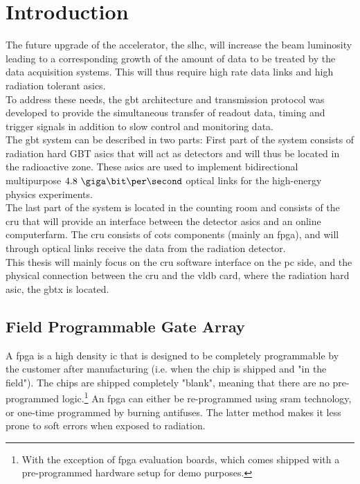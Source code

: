 \documentclass[main.tex]{subfiles}
\begin{document}
\chapter{Introduction}

The future upgrade of the  accelerator, the \gls{slhc}, will increase the beam luminosity leading to a corresponding growth of the amount of data to be treated by the data acquisition systems. This will thus require high rate data links and high radiation tolerant \glspl{asic}.\\

To address these needs, the \gls{gbt} architecture and transmission protocol was developed to provide the simultaneous transfer of readout data, timing and trigger signals in addition to slow control and monitoring data. \\

The \gls{gbt} system can be described in two parts: First part of the system consists of radiation hard GBT \glspl{asic} that will act as detectors and will thus be located in the radioactive zone. These \glspl{asic} are used to implement bidirectional multipurpose $4.8~\giga\bit\per\second$ optical links for the high-energy physics experiments. \\
The last part of the system is located in the counting room and consists of the \gls{cru} that will provide an interface between the detector \glspl{asic} and an online computerfarm. The \gls{cru} consists of \gls{cots} components (mainly an \acrshort{fpga}), and will through optical links receive the data from the radiation detector. \\

This thesis will mainly focus on the \gls{cru} software interface on the \acrshort{pc} side, and the physical connection between the \gls{cru} and the \gls{vldb} card, where the radiation hard \gls{asic}, the \gls{gbt}x is located.


\section{Field Programmable Gate Array}

A \gls{fpga} is a high density \gls{ic} that is designed to be completely programmable by the customer after manufacturing (i.e. when the chip is shipped and "in the field"). The chips are shipped completely "blank", meaning that there are no pre-programmed logic.\footnote{With the exception of \gls{fpga} evaluation boards, which comes shipped with a pre-programmed hardware setup for demo purposes.} An \gls{fpga} can either be re-programmed using \gls{sram} technology, or one-time programmed by burning antifuses. The latter method makes it less prone to soft errors when exposed to radiation.\\
\end{document}
